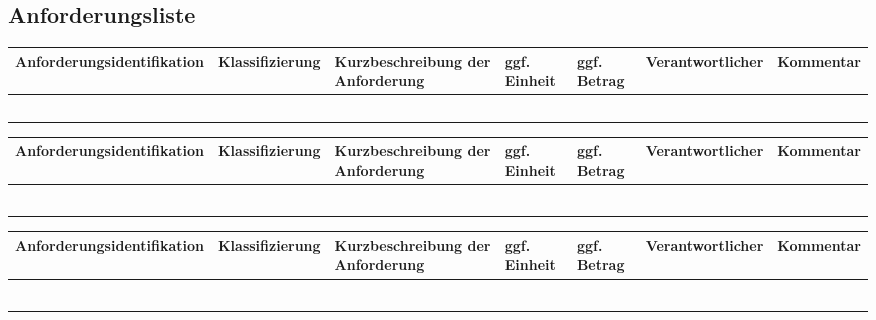 \begin{landscape}

\section{Anforderungsliste}

\begin{tabular}{|l|l|l|l|l|l|l|}
\hline
Anforderungsidentifikation&Klassifizierung&Kurzbeschreibung der Anforderung&ggf. Einheit&ggf. Betrag&Verantwortlicher&Kommentar\\
\hline
\rule{0pt}{75pt} & & & & & & \\
\hline
\rule{0pt}{75pt} & & & & & & \\
\hline
\rule{0pt}{75pt} & & & & & & \\
\hline
\rule{0pt}{75pt} & & & & & & \\
\hline
\rule{0pt}{75pt} & & & & & & \\
\hline
\end{tabular}

\newpage


\begin{tabular}{|l|l|l|l|l|l|l|}
\hline
Anforderungsidentifikation&Klassifizierung&Kurzbeschreibung der Anforderung&ggf. Einheit&ggf. Betrag&Verantwortlicher&Kommentar\\
\hline
\rule{0pt}{75pt} & & & & & & \\
\hline
\rule{0pt}{75pt} & & & & & & \\
\hline
\rule{0pt}{75pt} & & & & & & \\
\hline
\rule{0pt}{75pt} & & & & & & \\
\hline
\rule{0pt}{75pt} & & & & & & \\
\hline
\rule{0pt}{75pt} & & & & & & \\
\hline
\end{tabular}

\newpage


\begin{tabular}{|l|l|l|l|l|l|l|}
\hline
Anforderungsidentifikation&Klassifizierung&Kurzbeschreibung der Anforderung&ggf. Einheit&ggf. Betrag&Verantwortlicher&Kommentar\\
\hline
\rule{0pt}{75pt} & & & & & & \\
\hline
\rule{0pt}{75pt} & & & & & & \\
\hline
\rule{0pt}{75pt} & & & & & & \\
\hline
\rule{0pt}{75pt} & & & & & & \\
\hline
\rule{0pt}{75pt} & & & & & & \\
\hline
\rule{0pt}{75pt} & & & & & & \\
\hline
\end{tabular}

\end{landscape}
\newpage